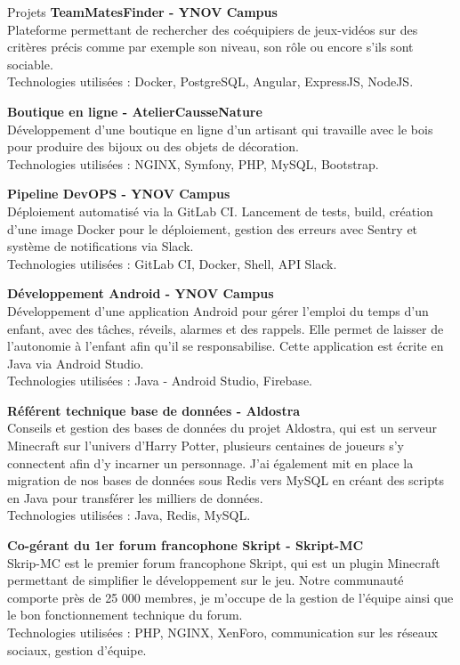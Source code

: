 \documentclass[
	11pt, %
]{resume} %
\begin{document}
\begin{rSection}{Projets}
	{\bf TeamMatesFinder - YNOV Campus}
	\\Plateforme permettant de rechercher des coéquipiers de jeux-vidéos sur des critères précis comme par exemple son niveau, son rôle ou encore s'ils sont sociable.
	\\ Technologies utilisées : Docker, PostgreSQL, Angular, ExpressJS, NodeJS.

	{\bf Boutique en ligne - AtelierCausseNature}
	\\Développement d'une boutique en ligne d'un artisant qui travaille avec le bois pour produire des bijoux ou des objets de décoration.
	\\ Technologies utilisées : NGINX, Symfony, PHP, MySQL, Bootstrap.

	{\bf Pipeline DevOPS - YNOV Campus}
	\\Déploiement automatisé via la GitLab CI. Lancement de tests, build, création d'une image Docker pour le déploiement, gestion des erreurs avec Sentry et système de notifications via Slack.
	\\ Technologies utilisées : GitLab CI, Docker, Shell, API Slack.

	{\bf Développement Android - YNOV Campus}
	\\Développement d'une application Android pour gérer l'emploi du temps d'un enfant, avec des tâches, réveils, alarmes et des rappels. 
	Elle permet de laisser de l'autonomie à l'enfant afin qu'il se responsabilise. Cette application est écrite en Java via Android Studio.
	\\ Technologies utilisées : Java - Android Studio, Firebase.

	{\bf Référent technique base de données - Aldostra}
	\\Conseils et gestion des bases de données du projet Aldostra, qui est un serveur Minecraft sur l'univers d'Harry Potter, plusieurs centaines de joueurs s'y connectent afin d'y incarner un personnage. J'ai également mit en place la migration de nos bases de données sous Redis vers MySQL en créant des scripts en Java pour transférer les milliers de données.
	\\ Technologies utilisées : Java, Redis, MySQL.

	{\bf Co-gérant du 1er forum francophone Skript - Skript-MC}
	\\Skrip-MC est le premier forum francophone Skript, qui est un plugin Minecraft permettant de simplifier le développement sur le jeu. 
	Notre communauté comporte près de 25 000 membres, je m'occupe de la gestion de l'équipe ainsi que le bon fonctionnement technique du forum.
	\\ Technologies utilisées : PHP, NGINX, XenForo, communication sur les réseaux sociaux, gestion d'équipe.


\end{rSection}
\end{document}
